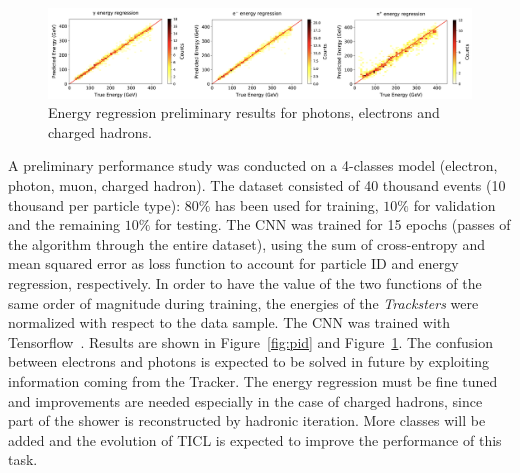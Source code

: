 \begin{figure}[h]
    \centering
    \includegraphics[width=.99\textwidth]{chapters/HGCal/figures/chef/er}
    \caption{\label{fig:er} Energy regression preliminary results for photons, electrons and charged hadrons.}
\end{figure}

A preliminary performance study was conducted on a 4-classes model (electron, photon, muon, charged hadron). The dataset consisted of 40 thousand events (10 thousand per particle type): $80\%$ has been used for training, $10\%$ for validation and the remaining $10\%$ for testing. The CNN was trained for 15 epochs (passes of the algorithm through the entire dataset), using the sum of cross-entropy and mean squared error as loss function to account for particle ID and energy regression, respectively. In order to have the value of the two functions of the same order of magnitude during training, the energies of the \emph{Tracksters} were normalized with respect to the data sample. The CNN was trained with Tensorflow~\cite{tensorflow2015-whitepaper}. Results are shown in Figure~\ref{fig:pid} and Figure~\ref{fig:er}. The confusion between electrons and photons is expected to be solved in future by exploiting information coming from the Tracker. The energy regression must be fine tuned and improvements are needed especially in the case of charged hadrons, since part of the shower is reconstructed by hadronic iteration. More classes will be added and the evolution of TICL is expected to improve the performance of this task.


